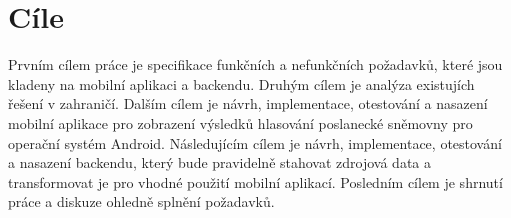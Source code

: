 \chapter*{Cíle}

\setcounter{page}{1}

Prvním cílem práce je specifikace funkčních a nefunkčních požadavků, které jsou kladeny na mobilní aplikaci a backendu. Druhým cílem je analýza existujích řešení v zahraničí. Dalším cílem je návrh, implementace, otestování a nasazení mobilní aplikace pro zobrazení výsledků hlasování poslanecké sněmovny pro operační systém Android. Následujícím cílem je \linebreak návrh, implementace, otestování a nasazení backendu, který bude pravidelně stahovat zdrojová data a transformovat je pro vhodné použití mobilní aplikací. Posledním cílem je shrnutí práce a diskuze ohledně splnění požadavků.